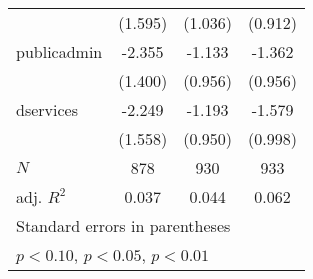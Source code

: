{\begin{tabular}{l*{3}{c}}
            &     (1.595)         &     (1.036)         &     (0.912)         \\
[1em]
publicadmin &      -2.355         &      -1.133         &      -1.362         \\
            &     (1.400)         &     (0.956)         &     (0.956)         \\
[1em]
dservices   &      -2.249         &      -1.193         &      -1.579         \\
            &     (1.558)         &     (0.950)         &     (0.998)         \\
\hline
\(N\)       &         878         &         930         &         933         \\
adj. \(R^{2}\)&       0.037         &       0.044         &       0.062         \\
\hline\hline
\multicolumn{4}{l}{\footnotesize Standard errors in parentheses}\\
\multicolumn{4}{l}{\footnotesize \sym{*} \(p<0.10\), \sym{**} \(p<0.05\), \sym{***} \(p<0.01\)}\\
\end{tabular}
}
